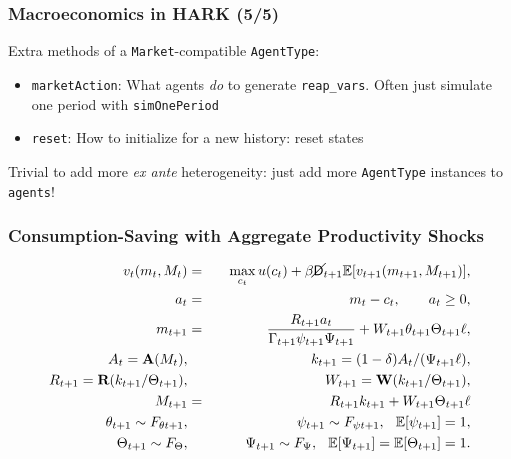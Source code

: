 \documentclass[11ptt]{beamer}
\newcommand{\bi}{\begin{itemize}}
\newcommand{\ei}{\end{itemize}}
\begin{document}
\begin{frame}
  \frametitle{Macroeconomics in HARK (5/5)}
  Extra methods of a \texttt{Market}-compatible \texttt{AgentType}:
  \bi
\item \texttt{marketAction}: What agents \textit{do} to generate \texttt{reap\_vars}.  Often just simulate one period with \texttt{simOnePeriod}

\item \texttt{reset}: How to initialize for a new history: reset states
  \ei

  Trivial to add more \textit{ex ante} heterogeneity: just add more \texttt{AgentType} instances to \texttt{agents}!
\end{frame}



\begin{frame}
  \frametitle{Consumption-Saving with Aggregate Productivity Shocks}
  \begin{eqnarray*}
    v_t(m_t,M_t) &=& \max_{c_t} u(c_t) + \beta \cancel{\mathsf{D}}_{t+1} \mathbb{E} [v_{t+1}(m_{t+1},M_{t+1}) ], \\
    a_t &=& m_t - c_t, \qquad a_t \geq 0, \\
    m_{t+1} &=& \frac{R_{t+1} a_t}{\Gamma_{t+1}\psi_{t+1} \Psi_{t+1}}  + W_{t+1} \theta_{t+1} \Theta_{t+1} \ell, \\
    A_t = \textbf{A}({M_t}),  & & k_{t+1} = (1-\delta)A_t/(\Psi_{t+1} \ell), \\
    R_{t+1} = \textbf{R}(k_{t+1}/\Theta_{t+1}), & & W_{t+1} = \textbf{W}(k_{t+1}/\Theta_{t+1}), \\
    M_{t+1} &=& R_{t+1} k_{t+1} + W_{t+1} \Theta_{t+1} \ell \\
    \theta_{t+1} \sim F_{\theta t+1}, &\qquad& \psi_{t+1} \sim F_{\psi t+1}, \hspace{0.25cm} \mathbb{E}[\psi_{t+1}] = 1, \\
    \Theta_{t+1} \sim F_{\Theta}, &\qquad& \Psi_{t+1} \sim F_{\Psi}, \hspace{0.25cm} \mathbb{E}[\Psi_{t+1}] = \mathbb{E}[\Theta_{t+1}] = 1.
  \end{eqnarray*}
\end{frame}
\end{document}
